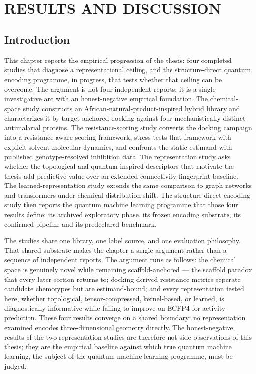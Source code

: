 \chapter{RESULTS AND DISCUSSION}
\label{Chap:3}
\adjustmtc[0]
\begin{tcolorbox}[beamer]
	\minitoc
\end{tcolorbox}
\newpage

\section{Introduction}\label{sec:ch3_intro}

This chapter reports the empirical progression of the thesis: four completed studies that diagnose a representational ceiling, and the structure-direct quantum encoding programme, in progress, that tests whether that ceiling can be overcome. The argument is not four independent reports; it is a single investigative arc with an honest-negative empirical foundation. The chemical-space study constructs an African-natural-product-inspired hybrid library and characterizes it by target-anchored docking against four mechanistically distinct antimalarial proteins. The resistance-scoring study converts the docking campaign into a resistance-aware scoring framework, stress-tests that framework with explicit-solvent molecular dynamics, and confronts the static estimand with published genotype-resolved inhibition data. The representation study asks whether the topological and quantum-inspired descriptors that motivate the thesis add predictive value over an extended-connectivity fingerprint baseline. The learned-representation study extends the same comparison to graph networks and transformers under chemical distribution shift. The structure-direct encoding study then reports the quantum machine learning programme that those four results define: its archived exploratory phase, its frozen encoding substrate, its confirmed pipeline and its predeclared benchmark.

The studies share one library, one label source, and one evaluation philosophy. That shared substrate makes the chapter a single argument rather than a sequence of independent reports. The argument runs as follows: the chemical space is genuinely novel while remaining scaffold-anchored --- the scaffold paradox that every later section returns to; docking-derived resistance metrics separate candidate chemotypes but are estimand-bound; and every representation tested here, whether topological, tensor-compressed, kernel-based, or learned, is diagnostically informative while failing to improve on ECFP4 for activity prediction. These four results converge on a shared boundary: no representation examined encodes three-dimensional geometry directly. The honest-negative results of the two representation studies are therefore not side observations of this thesis; they are the empirical baseline against which true quantum machine learning, the subject of the quantum machine learning programme, must be judged.

